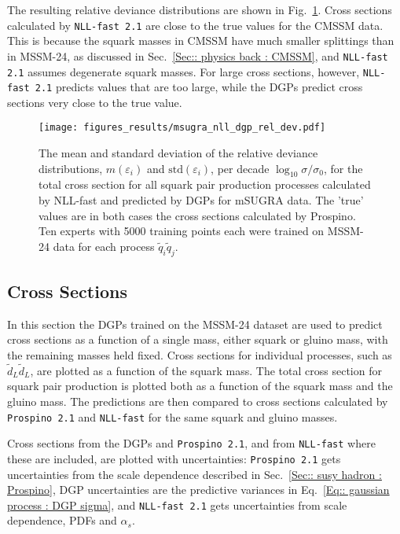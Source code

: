 \documentclass[twoside,english]{uiofysmaster}
\begin{document}
{The resulting relative deviance distributions are shown in Fig.~\ref{Fig:: results : RD CMSSM}. Cross sections calculated by \verb|NLL-fast 2.1| are close to the true values for the CMSSM data. This is because the squark masses in CMSSM have much smaller splittings than in MSSM-24, as discussed in Sec.~\ref{Sec:: physics back : CMSSM}, and \verb|NLL-fast 2.1| assumes degenerate squark masses. For large cross sections, however, \verb|NLL-fast 2.1| predicts values that are too large, while the DGPs predict cross sections very close to the true value.

\begin{figure}
\centering
\texttt{[image: figures\_results/msugra\_nll\_dgp\_rel\_dev.pdf]}
\caption{The mean and standard deviation of the relative deviance distributions, $m(\varepsilon_i)$ and $\mathrm{std}(\varepsilon_i)$, per decade $\log_{10} \sigma / \sigma_0$, for the total cross section for all squark pair production processes calculated by NLL-fast and predicted by DGPs for mSUGRA data. The 'true' values are in both cases the cross sections calculated by Prospino. Ten experts with 5000 training points each were trained on MSSM-24 data for each process $\widetilde{q}_i \widetilde{q}_j$.}
\label{Fig:: results : RD CMSSM}
\end{figure}

\subsection{Cross Sections}\label{Sec:: results : Cross Sections}

In this section the DGPs trained on the MSSM-24 dataset are used to predict cross sections as a function of a single mass, either squark or gluino mass, with the remaining masses held fixed. Cross sections for individual processes, such as $\widetilde{d}_L \widetilde{d}_L$, are plotted as a function of the squark mass. The total cross section for squark pair production is plotted both as a function of the squark mass and the gluino mass. The predictions are then compared to cross sections calculated by \verb|Prospino 2.1| and \verb|NLL-fast| for the same squark and gluino masses.

Cross sections from the DGPs and \verb|Prospino 2.1|, and from \verb|NLL-fast| where these are included, are plotted with uncertainties: \verb|Prospino 2.1| gets uncertainties from the scale dependence described in Sec.~\ref{Sec:: susy hadron : Prospino}, DGP uncertainties are the predictive variances in Eq.~\ref{Eq:: gaussian process : DGP sigma}, and \verb|NLL-fast 2.1| gets uncertainties from scale dependence, PDFs and $\alpha_s$.

}
\end{document}
